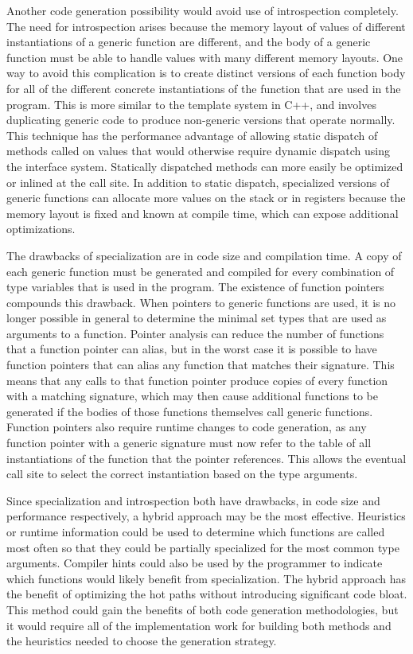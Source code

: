 \documentclass[letterpaper,twocolumn,11pt]{article}
\begin{document}
Another code generation possibility would avoid use of introspection completely. The need for introspection arises because the memory layout of values of different instantiations of a generic function are different, and the body of a generic function must be able to handle values with many different memory layouts. One way to avoid this complication is to create distinct versions of each function body for all of the different concrete instantiations of the function that are used in the program. This is more similar to the template system in C++, and involves duplicating generic code to produce non-generic versions that  operate normally. This technique has the performance advantage of allowing static dispatch of methods called on values that would otherwise require dynamic dispatch using the interface system. Statically dispatched methods can more easily be optimized or inlined at the call site. In addition to static dispatch, specialized versions of generic functions can allocate more values on the stack or in registers because the memory layout is fixed and known at compile time, which can expose additional optimizations. 

The drawbacks of specialization are in code size and compilation time. A copy of each generic function must be generated and compiled for every combination of type variables that is used in the program. The existence of function pointers compounds this drawback. When pointers to generic functions are used, it is no longer possible in general to determine the minimal set types that are used as arguments to a function. Pointer analysis can reduce the number of functions that a function pointer can alias, but in the worst case it is possible to have function pointers that can alias any function that matches their signature. This means that any calls to that function pointer produce copies of every function with a matching signature, which may then cause additional functions to be generated if the bodies of those functions themselves call generic functions. Function pointers also require runtime changes to code generation, as any function pointer with a generic signature must now refer to the table of all instantiations of the function that the pointer references. This allows the eventual call site to select the correct instantiation based on the type arguments. 

Since specialization and introspection both have drawbacks, in code size and performance respectively, a hybrid approach may be the most effective. Heuristics or runtime information could be used to determine which functions are called most often so that they could be partially specialized for the most common type arguments. Compiler hints could also be used by the programmer to indicate which functions would likely benefit from specialization. The hybrid approach has the benefit of optimizing the hot paths without introducing significant code bloat. This method could gain the benefits of both code generation methodologies, but it would require all of the implementation work for building both methods and the heuristics needed to choose the generation strategy.
\end{document}

